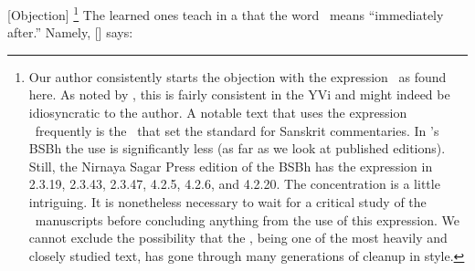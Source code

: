 [Objection]%
\footnote{Our author consistently starts the objection with the expression \nanuca\ as found here.  As noted by \citet[36]{wezler:yvi1}, this is fairly consistent in the YVi and might indeed be idiosyncratic to the author.  A notable text that uses the expression \nanuca\ frequently is the \VMBh\ that set the standard for Sanskrit commentaries.  In \Sankara's BSBh the use is significantly less (as far as we look at published editions).  Still, the Nirnaya Sagar Press edition of the BSBh has the expression in 2.3.19, 2.3.43, 2.3.47, 4.2.5, 4.2.6, and 4.2.20.  The concentration is a little intriguing.  It is nonetheless necessary to wait for a critical study of the \BSBh\ manuscripts before concluding anything from the use of this expression.  We cannot exclude the possibility that the \BSBh, being one of the most heavily and closely studied text, has gone through many generations of cleanup in style.} The learned ones teach in a \smrti\/ that the word \atha\ means ``immediately after.''  Namely,
[\Sabara] says:\label{SBRATH}
